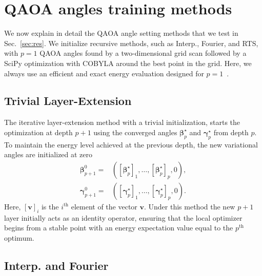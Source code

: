 \documentclass[twocolumn,
english,
aps,
pra,
10pt,
longbibliography,
superscriptaddress,
amsmath,
amssymb,
floatfix
]{revtex4-2}
\begin{document}
{\appendix

\section{QAOA angles training methods\label{app:param_methods}}

We now explain in detail the QAOA angle setting methods that we test in Sec.~\ref{sec:res}.
We initialize recursive methods, such as Interp., Fourier, and RTS, with $p=1$ QAOA angles found by a two-dimensional grid scan followed by a SciPy optimization with COBYLA around the best point in the grid.
Here, we always use an efficient and exact energy evaluation designed for $p=1$~\cite{Egger2021warmstartingquantum}.

\subsection{Trivial Layer-Extension \label{app:trivial}}

The iterative layer-extension method with a trivial initialization, starts the optimization at depth $p+1$ using the converged angles $\boldsymbol{\beta}_p^\star$ and $\boldsymbol{\gamma}_p^\star$ from depth $p$. 
To maintain the energy level achieved at the previous depth, the new variational angles are initialized at zero
\begin{align}
\boldsymbol{\beta}^{0}_{p+1} =& \left([\boldsymbol{\beta}_p^\star]_1, \dots, [\boldsymbol{\beta}_p^\star]_p, 0\right), \\
\boldsymbol{\gamma}_{p+1}^{0} =& \left([\boldsymbol{\gamma}_p^\star]_1, \dots, [\boldsymbol{\gamma}_{p}^\star]_p, 0\right).
\label{eq:trivial}
\end{align}
Here, $[\boldsymbol
v]_i$ is the $i^\text{th}$ element of the vector $\boldsymbol v$.
Under this method the new $p+1$ layer initially acts as an identity operator, ensuring that the local optimizer begins from a stable point with an energy expectation value equal to the $p^\text{th}$ optimum. 

\subsection{Interp. and Fourier\label{app:interp_fourier}}

}
\end{document}
